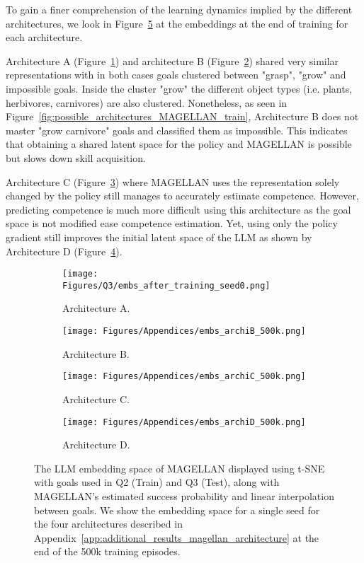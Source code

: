 To gain a finer comprehension of the learning dynamics implied by the different architectures, we look in Figure~\ref{fig:embs_archi_after} at the embeddings at the end of training for each architecture. 

Architecture A (Figure~\ref{fig:architecture_A_embed_after}) and architecture B (Figure~\ref{fig:architecture_B_embed_after}) shared very similar representations with in both cases goals clustered between "grasp", "grow" and impossible goals. Inside the cluster "grow" the different object types (i.e. plants, herbivores, carnivores) are also clustered. Nonetheless, as seen in Figure~\ref{fig:possible_architectures_MAGELLAN_train}, Architecture B does not master "grow carnivore" goals and classified them as impossible. This indicates that obtaining a shared latent space for the policy and MAGELLAN is possible but slows down skill acquisition.

Architecture C (Figure~\ref{fig:architecture_C_embed_after}) where MAGELLAN uses the representation solely changed by the policy still manages to accurately estimate competence. However, predicting competence is much more difficult using this architecture as the goal space is not modified ease competence estimation. Yet, using only the policy gradient still improves the initial latent space of the LLM as shown by Architecture D (Figure~\ref{fig:architecture_D_embed_after}).

\begin{figure}
\centering
\begin{subfigure}{.475\textwidth}
    \centering
    \texttt{[image: Figures/Q3/embs\_after\_training\_seed0.png]}  
    \caption{Architecture A.}
    \label{fig:architecture_A_embed_after}
\end{subfigure}
\begin{subfigure}{.475\textwidth}
    \centering
    \texttt{[image: Figures/Appendices/embs\_archiB\_500k.png]}  
    \caption{Architecture B.}
    \label{fig:architecture_B_embed_after}
\end{subfigure}
\begin{subfigure}{.475\textwidth}
    \centering
    \texttt{[image: Figures/Appendices/embs\_archiC\_500k.png]}  
    \caption{Architecture C.}
    \label{fig:architecture_C_embed_after}
\end{subfigure}
\begin{subfigure}{.475\textwidth}
    \centering
    \texttt{[image: Figures/Appendices/embs\_archiD\_500k.png]}  
    \caption{Architecture D.}
    \label{fig:architecture_D_embed_after}
\end{subfigure}
\caption{The LLM embedding space of MAGELLAN displayed using t-SNE with goals used in Q2 (Train) and Q3 (Test), along with MAGELLAN's estimated success probability and linear interpolation between goals. We show the embedding space for a single seed for the four architectures described in Appendix~\ref{app:additional_results_magellan_architecture} at the end of the 500k training episodes.}
\label{fig:embs_archi_after}
\end{figure}


